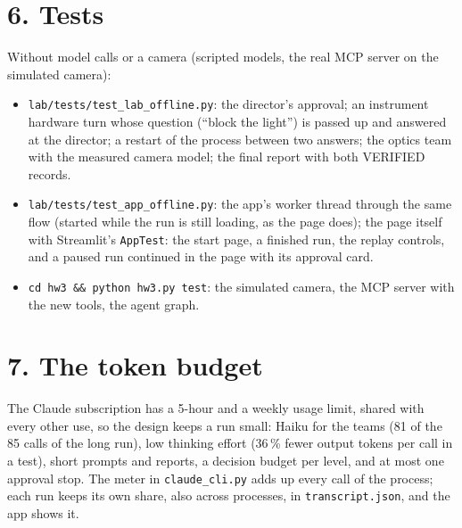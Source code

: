 \documentclass[11pt,a4paper]{article}
\begin{document}
\section*{6. Tests}
Without model calls or a camera (scripted models, the real MCP server on the simulated camera):
\begin{itemize}[leftmargin=*,itemsep=1pt]
\item \texttt{lab/tests/test\_lab\_offline.py}: the director's approval; an instrument hardware turn whose question
  (``block the light'') is passed up and answered at the director; a restart of the process between two answers; the
  optics team with the measured camera model; the final report with both VERIFIED records.
\item \texttt{lab/tests/test\_app\_offline.py}: the app's worker thread through the same flow (started while the run is
  still loading, as the page does); the page itself with Streamlit's \texttt{AppTest}: the start page, a finished run,
  the replay controls, and a paused run continued in the page with its approval card.
\item \texttt{cd hw3 \&\& python hw3.py test}: the simulated camera, the MCP server with the new tools, the agent graph.
\end{itemize}

\section*{7. The token budget}
The Claude subscription has a 5-hour and a weekly usage limit, shared with every other use, so the design keeps a run
small: Haiku for the teams (81 of the 85 calls of the long run), low thinking effort (36\,\% fewer output tokens per
call in a test), short prompts and reports, a decision budget per level, and at most one approval stop. The meter in
\texttt{claude\_cli.py} adds up every call of the process; each run keeps its own share, also across processes, in
\texttt{transcript.json}, and the app shows it.

\end{document}
